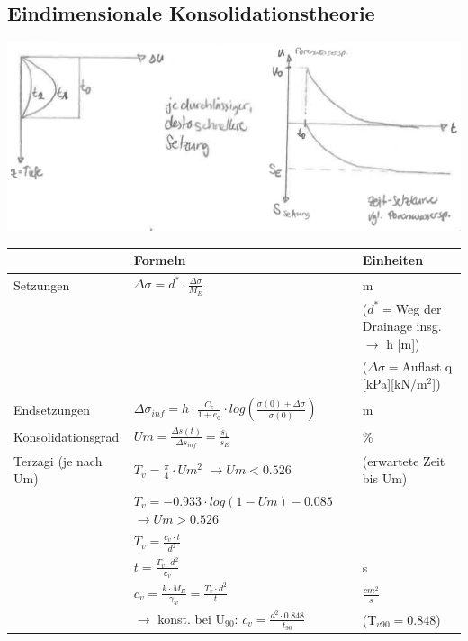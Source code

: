 	\begin{minipage}{\linewidth}

	\subsection{Eindimensionale Konsolidationstheorie}
	
		\includegraphics[width=0.7\linewidth]{images/Kons3PorenspTiefZeitSetzungsDiagramm.PNG} \\	
	\begin{tabular}{l|l|l}
				& Formeln											& Einheiten \\ \hline \hline

	Setzungen	& $\Delta\sigma=d^*\cdot \frac{\Delta \sigma}{M_E}$	& m \\
				&													&($d^*=$Weg der Drainage insg. $\rightarrow$ h [m]) \\
				&													&($\Delta\sigma=$Auflast q [kPa][kN/m$^2$]) \\
	Endsetzungen& $\Delta\sigma_{inf}=h\cdot \frac{C_c}{1+e_0}\cdot log\left(\frac{\sigma(0)+\Delta\sigma}{\sigma(0)}\right)$	& m \\ \hline
				
	Konsolidationsgrad & $Um=\frac{\Delta s(t)}{\Delta s_{inf}} = \frac{s_1}{s_E}	$	& \% \\ \hline		

	Terzagi
	(je nach Um)& $T_v=\frac{\pi}{4}\cdot Um^2$ $\rightarrow Um<0.526$& (erwartete Zeit bis Um)\\
				& $T_v=-0.933\cdot log(1-Um)-0.085$ $\rightarrow Um>0.526$& \\
				& $T_v=\frac{c_v \cdot t}{d^2}$						& \\
				& $t=\frac{T_v \cdot d^2}{c_v}$						& s \\
				& $c_v=\frac{k \cdot M_E}{\gamma_w} =\frac{T_v\cdot d^2}{t}$									&$\frac{cm^2}{s}$ \\
				& $\rightarrow$ konst. bei U$_{90}$: $c_v=\frac{d^2 \cdot 0.848}{t_{90}}$& (T$_{v90}=0.848$)\\ \hline


\end{tabular}
\end{minipage}
